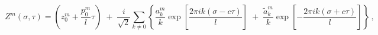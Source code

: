 \begin{equation}
Z^m(\sigma, \tau) = (z^m_0 + \frac{p^m_0}{l} \tau) \; + \;
 \frac{i}{\sqrt{2}} \sum_{k \neq  0}\left\{
   \frac{a^m_k}{k}\exp\left[\frac{2\pi i k (\sigma - c\tau)}{l}\right]
             \; + \;
   \frac{\tilde{a}^m_k}{k}\exp\left[-\frac{2\pi i k (\sigma + c\tau)}{l}\right]
  \right\} \,,
\end{equation}

